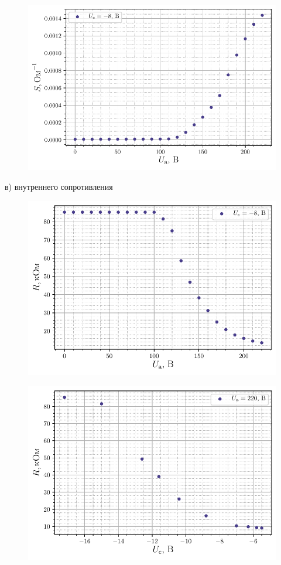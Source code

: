 \begin{figure}[H]
	\centering
    \includegraphics[width=0.7\linewidth]{scripts/fig3}
	\caption{}
	\label{fig:10}
\end{figure}

\newpage
в) внутреннего сопротивления
\begin{figure}[h!]
	\centering
    \includegraphics[width=0.7\linewidth]{scripts/fig5}
	\caption{}
	\label{fig:10}
\end{figure}

\begin{figure}[H]
	\centering
    \includegraphics[width=0.7\linewidth]{scripts/fig6}
	\caption{}
	\label{fig:10}
\end{figure}

